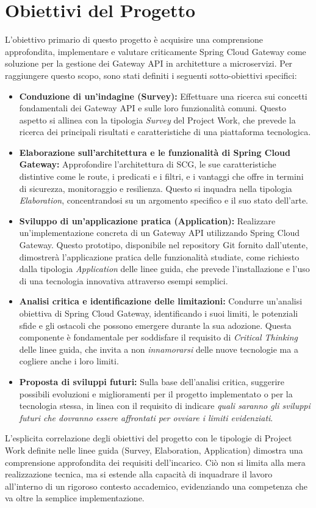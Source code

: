 \section{Obiettivi del Progetto}

L'obiettivo primario di questo progetto è acquisire una comprensione approfondita, implementare e valutare criticamente Spring Cloud Gateway come soluzione per la gestione dei Gateway API in architetture a microservizi. Per raggiungere questo scopo, sono stati definiti i seguenti sotto-obiettivi specifici:
\begin{itemize}
    \item \textbf{Conduzione di un'indagine (Survey):} Effettuare una ricerca sui concetti fondamentali dei Gateway API e sulle loro funzionalità comuni. Questo aspetto si allinea con la tipologia \textit{Survey} del Project Work, che prevede la ricerca dei principali risultati e caratteristiche di una piattaforma tecnologica.
    \item \textbf{Elaborazione sull'architettura e le funzionalità di Spring Cloud Gateway:} Approfondire l'architettura di SCG, le sue caratteristiche distintive come le route, i predicati e i filtri, e i vantaggi che offre in termini di sicurezza, monitoraggio e resilienza. Questo si inquadra nella tipologia \textit{Elaboration}, concentrandosi su un argomento specifico e il suo stato dell'arte.
    \item \textbf{Sviluppo di un'applicazione pratica (Application):} Realizzare un'implementazione concreta di un Gateway API utilizzando Spring Cloud Gateway. Questo prototipo, disponibile nel repository Git fornito dall'utente, dimostrerà l'applicazione pratica delle funzionalità studiate, come richiesto dalla tipologia \textit{Application} delle linee guida, che prevede l'installazione e l'uso di una tecnologia innovativa attraverso esempi semplici.
    \item \textbf{Analisi critica e identificazione delle limitazioni:} Condurre un'analisi obiettiva di Spring Cloud Gateway, identificando i suoi limiti, le potenziali sfide e gli ostacoli che possono emergere durante la sua adozione. Questa componente è fondamentale per soddisfare il requisito di \textit{Critical Thinking} delle linee guida, che invita a non \textit{innamorarsi} delle nuove tecnologie ma a cogliere anche i loro limiti.
    \item \textbf{Proposta di sviluppi futuri:} Sulla base dell'analisi critica, suggerire possibili evoluzioni e miglioramenti per il progetto implementato o per la tecnologia stessa, in linea con il requisito di indicare \textit{quali saranno gli sviluppi futuri che dovranno essere affrontati per ovviare i limiti evidenziati}.
\end{itemize}
L'esplicita correlazione degli obiettivi del progetto con le tipologie di Project Work definite nelle linee guida (Survey, Elaboration, Application) dimostra una comprensione approfondita dei requisiti dell'incarico. Ciò non si limita alla mera realizzazione tecnica, ma si estende alla capacità di inquadrare il lavoro all'interno di un rigoroso contesto accademico, evidenziando una competenza che va oltre la semplice implementazione.

